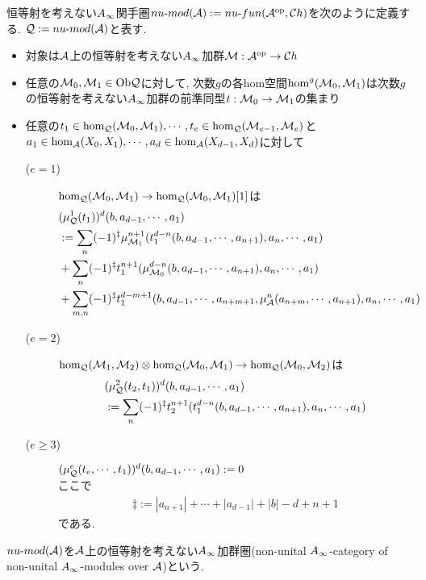 \documentclass[uplatex, a4paper, 14Q, dvipdfmx]{jsarticle}
\begin{document}
\begin{definition}
  恒等射を考えない$A_{\infty}$関手圏$nu \text{-} mod (\mathcal{A}) := nu \text{-} fun (\mathcal{A}^\mathrm{op}, \mathcal{C} h)$を次のように定義する. 
  $\mathcal{Q} := nu \text{-} mod (\mathcal{A})$と表す. 
  \begin{itemize}
    \item 対象は$\mathcal{A}$上の恒等射を考えない$A_{\infty}$加群$\mathcal{M} : \mathcal{A}^\mathrm{op} \to \mathcal{C} h$
    \item 任意の$\mathcal{M}_0,\mathcal{M}_1 \in \mathrm{Ob}\mathcal{Q}$に対して, 次数$g$の各hom空間$\hom^g(\mathcal{M}_0,\mathcal{M}_1)$は次数$g$の恒等射を考えない$A_{\infty}$加群の前準同型$t : \mathcal{M}_0 \to \mathcal{M}_1$の集まり
    \item 任意の$t_1 \in \hom_{\mathcal{Q}}(\mathcal{M}_0,\mathcal{M}_1),\cdots,t_e \in \hom_{\mathcal{Q}}(\mathcal{M}_{e-1},\mathcal{M}_e)$と$a_1 \in \hom_{\mathcal{A}}(X_0,X_1), \cdots, a_d \in \hom_{\mathcal{A}}(X_{d-1},X_d)$に対して
    \begin{description}
      \item[($e=1$)] $\hom_{\mathcal{Q}}(\mathcal{M}_0,\mathcal{M}_1) \to \hom_{\mathcal{Q}}(\mathcal{M}_0,\mathcal{M}_1)[1]$は
      \begin{align*}
        &(\mu^1_{\mathcal{Q}}(t_1))^d(b,a_{d-1},\cdots,a_1) \\
        &:= \sum_n (-1)^\ddagger \mu^{n+1}_{\mathcal{M}_1}(t_1^{d-n}(b,a_{d-1},\cdots,a_{n+1}), a_n, \cdots, a_1) \\
        &+ \sum_n (-1)^\ddagger t_1^{n+1}(\mu^{d-n}_{\mathcal{M}_0}(b,a_{d-1},\cdots,a_{n+1}), a_n, \cdots, a_1) \\
        &+ \sum_{m,n} (-1)^\ddagger t_1^{d-m+1}(b, a_{d-1}, \cdots, a_{n+m+1}, \mu^n_{\mathcal{A}}(a_{n+m},\cdots,a_{n+1}), a_n, \cdots, a_1)
      \end{align*}
      \item[($e=2$)] $\hom_{\mathcal{Q}}(\mathcal{M}_1,\mathcal{M}_2) \otimes \hom_{\mathcal{Q}}(\mathcal{M}_0,\mathcal{M}_1) \to \hom_{\mathcal{Q}}(\mathcal{M}_0,\mathcal{M}_2)$は
      \begin{align*}
        &(\mu^2_{\mathcal{Q}}(t_2,t_1))^d(b,a_{d-1},\cdots,a_1) \\
        &:= \sum_n (-1)^\ddagger t^{n+1}_2(t^{d-n}_1(b,a_{d-1},\cdots,a_{n+1}), a_n, \cdots, a_1)
      \end{align*}
      \item[($e \geq 3$)] $(\mu^e_{\mathcal{Q}}(t_e,\cdots,t_1))^d (b,a_{d-1},\cdots,a_1):= 0$ \\
      ここで
      \begin{align*}
        \ddagger
        := |a_{n+1}| + \cdots + |a_{d-1}| + |b| - d + n + 1
      \end{align*}
      である. 
    \end{description}
  \end{itemize}
  $nu \text{-} mod (\mathcal{A})$を$\mathcal{A}$上の恒等射を考えない$A_{\infty}$加群圏(non-unital $A_{\infty}$-category of non-unital $A_{\infty}$-modules over $\mathcal{A}$)という. 
\end{definition}
\end{document}
